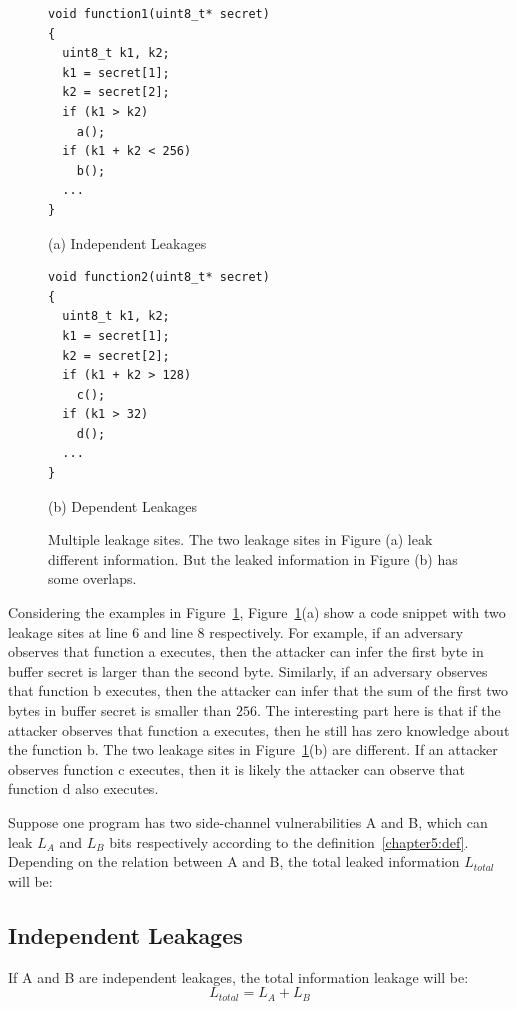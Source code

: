 \begin{figure}[h]
\begin{minipage}{0.4\linewidth}
\begin{lstlisting}
void function1(uint8_t* secret)
{
  uint8_t k1, k2;
  k1 = secret[1];
  k2 = secret[2];
  if (k1 > k2)
    a();
  if (k1 + k2 < 256)
    b();
  ...
}
\end{lstlisting}\caption*{(a) Independent Leakages}
\end{minipage}
\hfill
\begin{minipage}{0.4\linewidth}
\begin{lstlisting}
void function2(uint8_t* secret)
{
  uint8_t k1, k2;
  k1 = secret[1];
  k2 = secret[2];
  if (k1 + k2 > 128)
    c();
  if (k1 > 32)
    d();
  ...
}
\end{lstlisting} \caption*{(b) Dependent Leakages}
\end{minipage}
\caption{Multiple leakage sites. The two leakage sites in Figure (a) leak different information. But the leaked information in Figure (b) has some overlaps. }\label{chapter5:fig:multiple}
\end{figure}

Considering the examples in Figure~\ref{chapter5:fig:multiple}, Figure~\ref{chapter5:fig:multiple}(a) show a code snippet with two leakage sites at line 6 and line 8 respectively. For example, if an adversary observes that function \textsf{a} executes, then the attacker can infer the first byte in buffer \textsf{secret} is larger than the second byte.  Similarly, if an adversary observes that function \textsf{b} executes, then the attacker can infer that the sum of the first two bytes in buffer \textsf{secret} is smaller than $256$. The interesting part here is that if the attacker observes that function \textsf{a} executes, then he still has zero knowledge about the function \textsf{b}. The two leakage sites in Figure~\ref{chapter5:fig:multiple}(b) are different. If an attacker observes function \textsf{c} executes, then it is likely the attacker can observe that function \textsf{d} also executes. 

Suppose one program has two side-channel vulnerabilities A and B, which can leak $L_A$ and $L_B$ bits respectively according to the definition~\ref{chapter5:def}. 
Depending on the relation between A and B, the total leaked information $L_{\mathit{total}}$ will be:

\subsection{Independent Leakages}
If A and B are independent leakages, the total information leakage will be:
\[L_{\mathit{total}} = L_A + L_B \]

